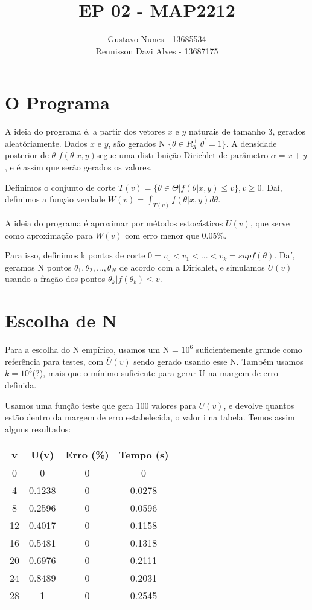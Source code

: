 \documentclass{article}
\date{}
\title{\vspace{-2.0cm}EP 02 - MAP2212}
\author{Gustavo Nunes - 13685534 \\Rennisson Davi Alves - 13687175}
\begin{document}
		\maketitle

	\section{O Programa}
	A ideia do programa é, a partir dos vetores $x$ e $y$ naturais de tamanho 3, gerados aleatóriamente. Dados $x$ e $y$, são gerados N $\{\theta \in R_3^+ | \theta^{'}=1 \}$. A densidade posterior de $\theta$ $f(\theta|x, y)$segue uma distribuição Dirichlet de parâmetro $\alpha = x + y$, e é assim que serão gerados os valores.

	Definimos o conjunto de corte $T(v) = \{\theta \in \Theta | f(\theta | x, y) \leq v\}, v\geq0$. Daí, definimos a função verdade $W(v) = \int_{T(v)}f(\theta|x, y)d\theta$.

	A ideia do programa é aproximar por métodos estocásticos $U(v)$, que serve como aproximação para $W(v)$ com erro menor que $0.05\%$.

	Para isso, definimos k pontos de corte $0 = v_0 < v_1 < ... < v_k = sup f(\theta)$. Daí, geramos N pontos $\theta_1, \theta_2, ..., \theta_N$ de acordo com a Dirichlet, e simulamos $U(v)$ usando a fração dos pontos $\theta_k | f(\theta_k)  \leq v $.

	\section{Escolha de N}

	Para a escolha do N empírico, usamos um N = $10^{6}$ suficientemente grande como referência para testes, com $\bar{U}(v)$ sendo gerado usando esse N. Também usamos $k = 10^5$(?), mais que o mínimo suficiente para gerar U na margem de erro definida.

	Usamos uma função teste que gera 100 valores para $U(v)$, e devolve quantos estão dentro da margem de erro estabelecida, o valor i na tabela. Temos assim alguns resultados:

	\begin{table}[htbp]
            \centering
		\begin{tabular}{|c|c|c|c|c|}
			\textbf{v} & \textbf{U(v)} & \textbf{Erro (\%)} & \textbf{Tempo (s)}\\
			\hline
			0    & 0         & 0     & 0\\
			4    & 0.1238    & 0     & 0.0278\\
			8    & 0.2596    & 0     & 0.0596\\
                12   & 0.4017    & 0     & 0.1158\\
                16   & 0.5481    & 0     & 0.1318\\
                20   & 0.6976    & 0     & 0.2111\\
                24   & 0.8489    & 0     & 0.2031\\
                28   & 1         & 0     & 0.2545\\
		\end{tabular}
	\end{table}
\end{document}

